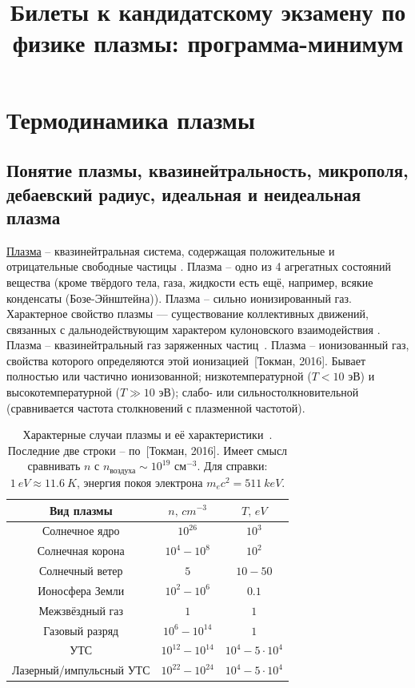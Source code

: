 \documentclass[10pt, a4paper]{article}
\title{Билеты к кандидатскому экзамену по физике плазмы: программа-минимум}
\date{}
\numberwithin{equation}{section}
\newcommand{\Tokman}{~[Токман, 2016]}
\begin{document}
\maketitle

\section{Термодинамика плазмы}

\subsection{Понятие плазмы, квазинейтральность, микрополя, дебаевский радиус, идеальная и неидеальная плазма}

\uline{Плазма} -- квазинейтральная система, содержащая положительные и отрицательные свободные частицы \cite{frank}. Плазма -- одно из 4 агрегатных состояний вещества (кроме твёрдого тела, газа, жидкости есть ещё, например, всякие конденсаты (Бозе-Эйнштейна)). Плазма -- сильно ионизированный газ. Характерное свойство плазмы — существование коллективных
движений, связанных с дальнодействующим характером кулоновского взаимодействия \cite{kroll}. Плазма -- квазинейтральный газ заряженных частиц~\cite{kotelnikov}. Плазма -- ионизованный газ, свойства которого определяются этой ионизацией\Tokman. Бывает полностью или частично ионизованной; низкотемпературной ($T<10$ эВ) и высокотемпературной ($T\gg10$ эВ); слабо- или сильностолкновительной (сравнивается частота столкновений с плазменной частотой).

\begin{table}[h!]
	\caption{Характерные случаи плазмы и её характеристики~\cite{kotelnikov}. \linebreak Последние две строки -- по\Tokman. Имеет смысл сравнивать $n$ с $n_\text{воздуха} \sim 10^{19}$ см$^{-3}$.	Для справки: $1\ eV \approx 11.6\ K$, энергия покоя электрона $m_e c^2 = 511\ keV$.}
	\label{tabular:typical_plasma}
	\begin{center}
		\begin{tabular}{|c|c|c|}
			\hline
			Вид плазмы & $n,\,cm^{-3}$ & $T,\,eV$ \\ \hline
			Солнечное ядро & $10^{26}$ & $10^3$ \\
			Солнечная корона & $10^4-10^8$ & $10^2$ \\
			Солнечный ветер & $5$ & $10-50$ \\
			Ионосфера Земли & $10^2-10^6$ & $0.1$ \\
			Межзвёздный газ & $1$ & $1$ \\
			Газовый разряд & $10^{6}-10^{14}$ & $1$ \\
			УТС & $10^{12}-10^{14}$ & $10^4-5\cdot10^4$ \\
			Лазерный/импульсный УТС & $10^{22}-10^{24}$ & $10^4-5\cdot10^4$ \\
			\hline
		\end{tabular}
	\end{center}
\end{table}
\end{document}
